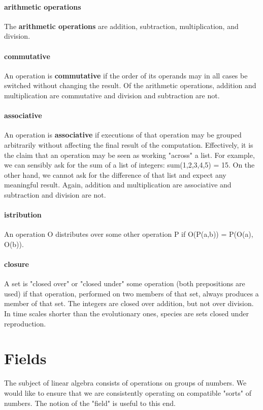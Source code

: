 \documentclass[12pt,letterpaper,final]{article}
\begin{document}
\paragraph{arithmetic operations} The \textbf{arithmetic operations} are addition, subtraction, multiplication, and division. 

\paragraph{commutative} An operation is \textbf{commutative} if the order of its operands may in all cases be switched without changing the result. Of the arithmetic operations, addition and multiplication are commutative and division and subtraction are not. 

\paragraph{associative} An operation is \textbf{associative} if executions of that operation may be grouped arbitrarily without affecting the final result of the computation. Effectively, it is the claim that an operation may be seen as working "across" a list. For example, we can sensibly ask for the sum of a list of integers: sum(1,2,3,4,5) = 15. On the other hand, we cannot ask for the difference of that list and expect any meaningful result. Again, addition and multiplication are associative and subtraction and division are not. 

\paragraph{istribution} An operation O distributes over some other operation P if O(P(a,b)) = P(O(a), O(b)). 

\paragraph{closure} A set is "closed over" or "closed under" some operation (both prepositions are used) if that operation, performed on two members of that set, always produces a member of that set. The integers are closed over addition, but not over division.  In time scales shorter than the evolutionary ones, species are sets closed under reproduction. 

\section{Fields}
The subject of linear algebra consists of operations on groups of numbers. We would like to ensure that we are consistently operating on compatible "sorts" of numbers. The notion of the "field" is useful to this end. 
\end{document}
